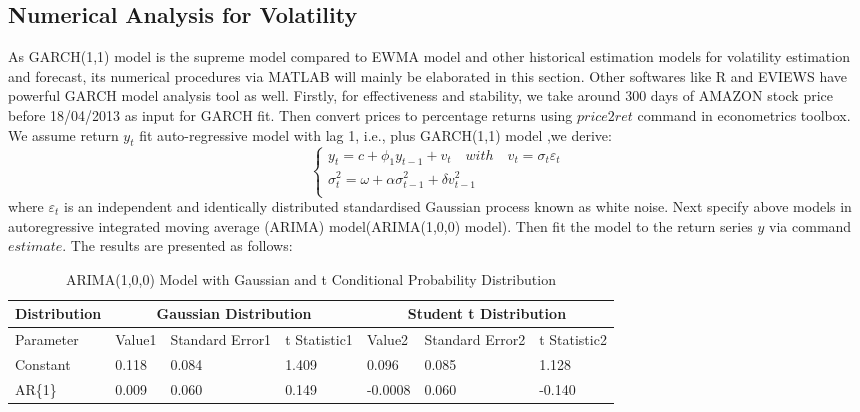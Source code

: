 \subsection{Numerical Analysis for Volatility}
As GARCH(1,1) model is the supreme model compared to EWMA model and other historical estimation models for volatility estimation and forecast, its numerical procedures via MATLAB will mainly be elaborated in this section. Other softwares like R and EVIEWS have powerful GARCH model analysis tool as well. Firstly, for effectiveness and stability, we take around 300 days of AMAZON stock price before 18/04/2013 as input for GARCH fit. Then convert prices to percentage returns using $price2ret$ command in econometrics toolbox. We assume return $y_t$ fit auto-regressive model with lag 1, i.e., plus GARCH(1,1) model ,we derive:
\begin{equation}
  \begin{cases}
y_t=c+\phi_1y_{t-1}+v_t  \quad with \quad v_t=\sigma_t\varepsilon_t \\
 \sigma_t^2=\omega+\alpha\sigma_{t-1}^2+\delta v_{t-1}^2 \\
  \end{cases}
\end{equation}
where $\varepsilon_t$ is an independent and identically distributed standardised Gaussian process known as white noise. Next specify above models in autoregressive integrated moving average (ARIMA) model(ARIMA(1,0,0) model). Then fit the model to the return series $y$ via command $estimate$. The results are presented as follows:
\begin{table}[h!]
\centering
\caption{ARIMA(1,0,0) Model with Gaussian and t Conditional Probability Distribution}
\begin{tabular}{ |p{2cm}|p{1.3cm}|p{1.5cm}|p{1.5cm}|p{1.3cm}|p{1.5cm}|p{1.5cm}|}
 \hline
Distribution& \multicolumn{3}{|c|}{Gaussian Distribution}&\multicolumn{3}{|c|}{Student t Distribution} \\
 \hline
Parameter&Value1&Standard Error1&t Statistic1&Value2&Standard Error2&t Statistic2\\
 \hline
Constant&0.118&0.084&1.409&0.096&0.085&1.128\\
AR\{1\}&0.009&0.060&0.149&-0.0008&0.060&-0.140\\
 \hline
\end{tabular}
\end{table}
